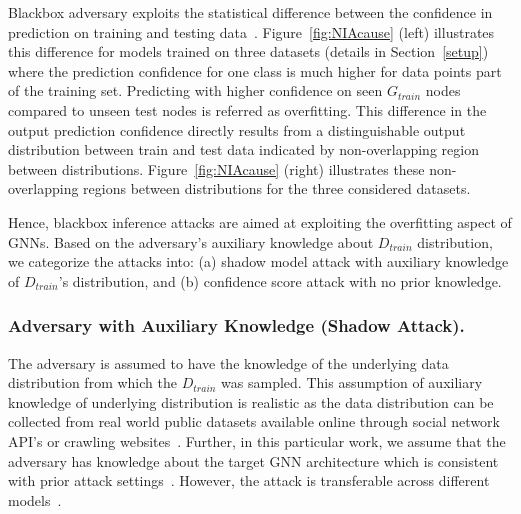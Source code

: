 Blackbox adversary exploits the statistical difference between the confidence in prediction on training and testing data~\cite{7958568}. %
Figure~\ref{fig:NIAcause} (left) illustrates this difference for models trained on three datasets (details in Section~\ref{setup}) where the prediction confidence for one class is much higher for data points part of the training set.
Predicting with higher confidence on seen $G_{train}$ nodes compared to unseen test nodes is referred as overfitting.
This difference in the output prediction confidence directly results from a distinguishable output distribution between train and test data indicated by non-overlapping region between distributions.
Figure~\ref{fig:NIAcause} (right) illustrates these non-overlapping regions between distributions for the three considered datasets.


Hence, blackbox inference attacks are aimed at exploiting the overfitting aspect of GNNs.
Based on the adversary's auxiliary knowledge about $D_{train}$ distribution, we categorize the attacks into: (a) shadow model attack with auxiliary knowledge of $D_{train}$'s distribution, and (b) confidence score attack with no prior knowledge.

\subsubsection{Adversary with Auxiliary Knowledge (Shadow Attack).} The adversary is assumed to have the knowledge of the underlying data distribution from which the $D_{train}$ was sampled.
This assumption of auxiliary knowledge of underlying distribution is realistic as the data distribution can be collected from real world public datasets available online through social network API's or crawling websites~\cite{logan}.
Further, in this particular work, we assume that the adversary has knowledge about the target GNN architecture which is consistent with prior attack settings~\cite{7958568,logan,10.1504/IJSN.2015.071829,10.1145/3243734.3243834,10.1145/3243734.3243855,10.1145/3319535.3363201}.
However, the attack is transferable across different models~\cite{ndss19salem}.


